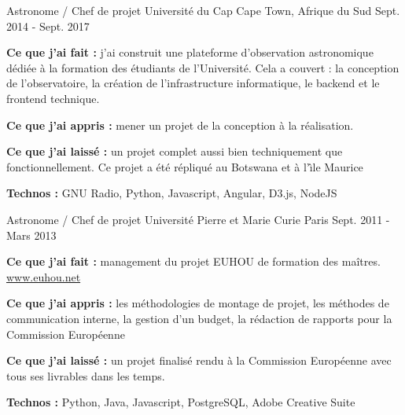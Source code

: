 \begin{cventries}
  \cventry
    {Astronome / Chef de projet} %
    {Université du Cap} %
    {Cape Town, Afrique du Sud} %
    {Sept. 2014 - Sept. 2017} %
    {
      \begin{cvitems} %
        \item {\textbf{Ce que j'ai fait :} j'ai construit une plateforme d'observation astronomique dédiée à la formation des étudiants de l'Université. Cela a couvert : la conception de l'observatoire, la création de l'infrastructure informatique, le backend et le frontend technique.}
        \item {\textbf{Ce que j'ai appris :} mener un projet de la conception à la réalisation.}
        \item {\textbf{Ce que j'ai laissé :} un projet complet aussi bien techniquement que fonctionnellement. Ce projet a été répliqué au Botswana et à l'\^\i le Maurice}
        \item {\textbf{Technos :} GNU Radio, Python, Javascript, Angular, D3.js, NodeJS}
      \end{cvitems}
    }

  \cventry
    {Astronome / Chef de projet} %
    {Université Pierre et Marie Curie} %
    {Paris} %
    {Sept. 2011 - Mars 2013} %
    {
      \begin{cvitems} %
        \item {\textbf{Ce que j'ai fait :} management du projet EUHOU de formation des maîtres. \url{www.euhou.net}}
        \item {\textbf{Ce que j'ai appris :} les méthodologies de montage de projet, les méthodes de communication interne, la gestion d'un budget, la rédaction de rapports pour la Commission Européenne}
        \item {\textbf{Ce que j'ai laissé :} un projet finalisé rendu à la Commission Européenne avec tous ses livrables dans les temps. }
        \item {\textbf{Technos :} Python, Java, Javascript, PostgreSQL, Adobe Creative Suite}
      \end{cvitems}
    }


\end{cventries}
